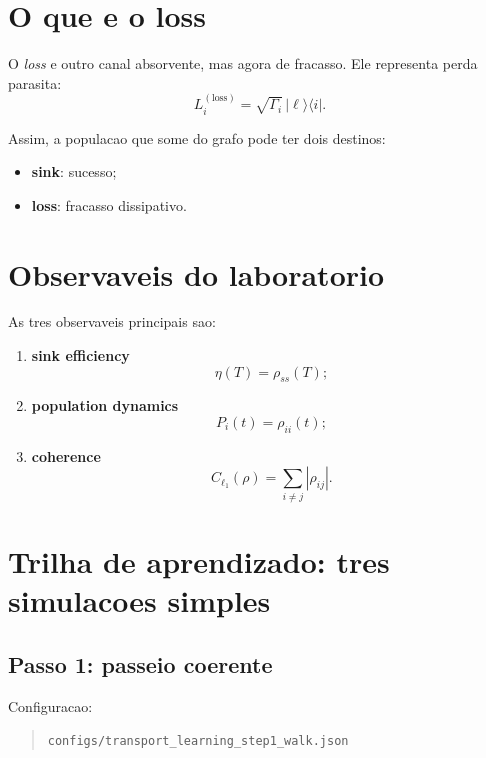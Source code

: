 \documentclass[11pt,a4paper]{article}
\begin{document}
\section{O que e o loss}

O \emph{loss} e outro canal absorvente, mas agora de fracasso. Ele representa
perda parasita:
\begin{equation}
L_i^{(\mathrm{loss})} = \sqrt{\Gamma_i}\,|\ell\rangle\langle i|.
\end{equation}

Assim, a populacao que some do grafo pode ter dois destinos:
\begin{itemize}
  \item \textbf{sink}: sucesso;
  \item \textbf{loss}: fracasso dissipativo.
\end{itemize}

\section{Observaveis do laboratorio}

As tres observaveis principais sao:
\begin{enumerate}
  \item \textbf{sink efficiency}
  \begin{equation}
  \eta(T)=\rho_{ss}(T);
  \end{equation}
  \item \textbf{population dynamics}
  \begin{equation}
  P_i(t)=\rho_{ii}(t);
  \end{equation}
  \item \textbf{coherence}
  \begin{equation}
  C_{\ell_1}(\rho)=\sum_{i\neq j}|\rho_{ij}|.
  \end{equation}
\end{enumerate}

\section{Trilha de aprendizado: tres simulacoes simples}

\subsection{Passo 1: passeio coerente}

Configuracao:
\begin{quote}
\texttt{configs/transport\_learning\_step1\_walk.json}
\end{quote}
\end{document}
